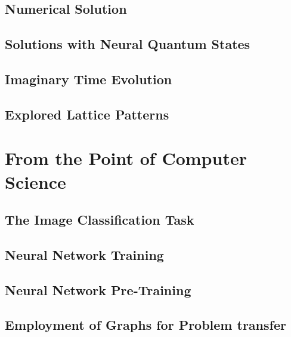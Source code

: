 \documentclass[
headings=optiontohead,              %
12pt,                               %
DIV=13,                             %
twoside=false,                      %
open=right,                         %
BCOR=10mm,                          %
toc=bibliographynumbered            %
]{scrreport}
\begin{document}
        \subsection{Numerical Solution}
        \label{sec:theory-numericalsolution}
        
        \FloatBarrier
        \subsection{Solutions with Neural Quantum States}
        \label{sec:theory-neuralquantumstates}
        
        \FloatBarrier
        \subsection{Imaginary Time Evolution}
        \label{sec:theory-imagenarytimeevolution}
        
        \FloatBarrier
        \subsection{Explored Lattice Patterns}
        \label{sec:theory-latticepatterns}
        
        \FloatBarrier
    \section{From the Point of Computer Science}
        \label{sec:theory-cs}
        
        \FloatBarrier
        \subsection{The Image Classification Task}
        \label{sec:theory-imageclassification}
        \subsection{Neural Network Training}
        \label{sec:theory-neuralnetworktraining}
        \subsection{Neural Network Pre-Training}
        \label{sec:theory-pretraining}
        \subsection{Employment of Graphs for Problem transfer}
        \label{sec:theory-graphs}
\end{document}
